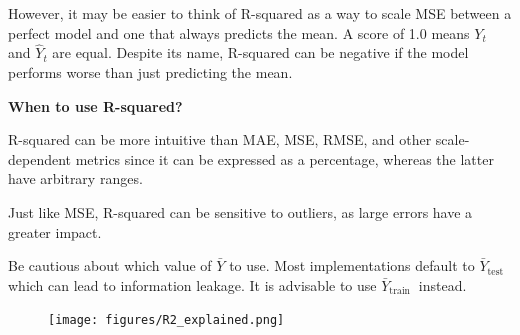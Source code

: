 \begin{center}
\end{center}

However, it may be easier to think of R-squared as a way to scale MSE between a perfect model and one that always predicts the mean. A score of 1.0 means $Y_t$ and $\hat{Y}_t$ are equal. Despite its name, R-squared can be negative if the model performs worse than just predicting the mean.

\textbf{When to use R-squared?}

R-squared can be more intuitive than MAE, MSE, RMSE, and other scale-dependent metrics since it can be expressed as a percentage, whereas the latter have arbitrary ranges.

{
    \item Just like MSE, R-squared can be sensitive to outliers, as large errors have a greater impact.
    \item Be cautious about which value of $\bar{Y}$ to use. Most implementations default to $\bar{Y}_{\text {test }}$ which can lead to information leakage. It is advisable to use $\bar{Y}_{\text {train }}$ instead.
}


\clearpage
\thispagestyle{customstyle}


\begin{figure}[ht!]
    \centering
    \texttt{[image: figures/R2\_explained.png]}
    \label{fig1}
\end{figure}

